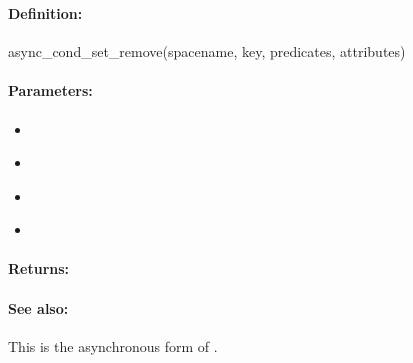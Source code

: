 \pagebreak
\subsubsection{}
\label{api:ruby:async_cond_set_remove}


\paragraph{Definition:}
\begin{rubycode}
async_cond_set_remove(spacename, key, predicates, attributes)
\end{rubycode}

\paragraph{Parameters:}
\begin{itemize}[noitemsep]
\item {}\\

\item {}\\

\item {}\\

\item {}\\

\end{itemize}

\paragraph{Returns:}


\paragraph{See also:}  This is the asynchronous form of .

\pagebreak
\subsubsection{}
\label{api:ruby:group_set_remove}


